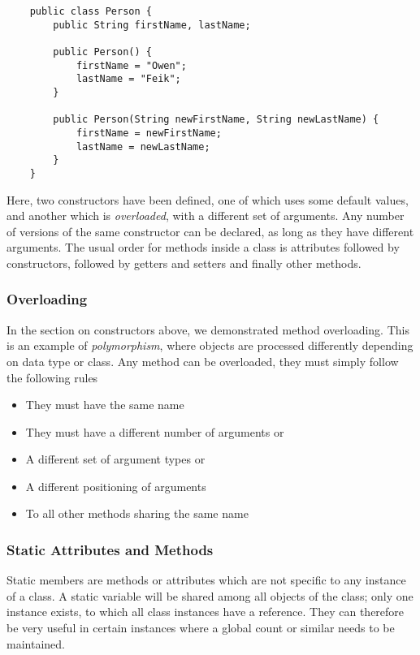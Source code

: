 \documentclass[12pt]{report}
\begin{document}
\begin{flushleft}
\begin{lstlisting}
    public class Person {
        public String firstName, lastName;    

        public Person() {
            firstName = "Owen";
            lastName = "Feik";
        }

        public Person(String newFirstName, String newLastName) {
            firstName = newFirstName;
            lastName = newLastName;
        }
    }
\end{lstlisting}

Here, two constructors have been defined, one of which uses some default
values, and another which is \textit{overloaded}, with a different set of
arguments. Any number of versions of the same constructor can be declared, as
long as they have different arguments. The usual order for methods inside a
class is attributes followed by constructors, followed by getters and setters
and finally other methods.

\subsubsection*{Overloading}

In the section on constructors above, we demonstrated method overloading. This
is an example of \textit{polymorphism}, where objects are processed differently
depending on data type or class. Any method can be overloaded, they must simply
follow the following rules

\begin{itemize}
    \item They must have the same name
    \item They must have a different number of arguments or
    \item A different set of argument types or
    \item A different positioning of arguments
    \item To all other methods sharing the same name
\end{itemize}

\subsubsection*{Static Attributes and Methods}
Static members are methods or attributes which are not specific to any instance
of a class. A static variable will be shared among all objects of the class; 
only one instance exists, to which all class instances have a reference. They
can therefore be very useful in certain instances where a global count or 
similar needs to be maintained.


\end{flushleft}
\end{document}
